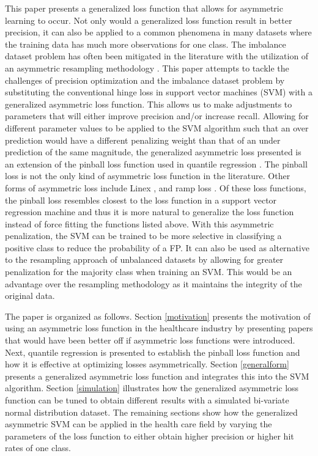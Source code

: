 \documentclass[twoside,11pt]{article}
\begin{document}
This paper presents a generalized loss function that allows for asymmetric learning to occur. Not only would a generalized loss function result in better precision, it can also be applied to a common phenomena in many datasets where the training data has much more observations for one class. The imbalance dataset problem has often been mitigated in the literature with the utilization of an asymmetric resampling methodology \citep{Hamed04}. This paper attempts to tackle the challenges of precision optimization and the imbalance dataset problem by substituting the conventional hinge loss in support vector machines (SVM) with a generalized asymmetric loss function. This allows us to make adjustments to parameters that will either improve precision and/or increase recall. Allowing for different parameter values to be applied to the SVM algorithm such that an over prediction would have a different penalizing weight than that of an under prediction of the same magnitude, the generalized asymmetric loss presented is an extension of the pinball loss function \citet{Koenker01} used in quantile regression \citep{Steinwart07}. The pinball loss is not the only kind of asymmetric loss function in the literature. Other forms of asymmetric loss include Linex \citep{Demetrescu07} \citep{Ohtani95}, and ramp loss \citep{Takeuchi06}. Of these loss functions, the pinball loss resembles closest to the loss function in a support vector regression machine and thus it is more natural to generalize the loss function instead of force fitting the functions listed above. With this asymmetric penalization, the SVM can be trained to be more selective in classifying a positive class to reduce the probability of a FP. It can also be used as alternative to the resampling approach of unbalanced datasets by allowing for greater penalization for the majority class when training an SVM. This would be an advantage over the resampling methodology as it maintains the integrity of the original data.

The paper is organized as follows. Section \ref{motivation} presents the motivation of using an asymmetric loss function in the healthcare industry by presenting papers that would have been better off if asymmetric loss functions were introduced. Next, quantile regression is presented to establish the pinball loss function and how it is effective at optimizing losses asymmetrically. Section \ref{generalform} presents a generalized asymmetric loss function and integrates this into the SVM algorithm. Section \ref{simulation} illustrates how the generalized asymmetric loss function can be tuned to obtain different results with a simulated bi-variate normal distribution dataset. The remaining sections show how the generalized asymmetric SVM can be applied in the health care field by varying the parameters of the loss function to either obtain higher precision or higher hit rates of one class.
\end{document}
